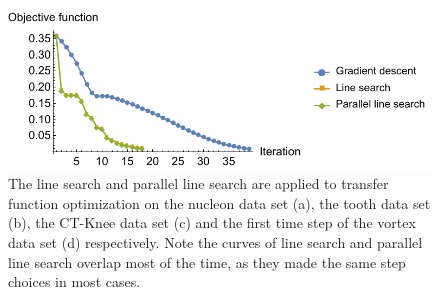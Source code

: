 \begin{figure}
	\begin{minipage}{.5\textwidth}
		\includegraphics[width=1\linewidth]{figures/vortex_naive_proportional_rms_fixed_linesearch_parallel}
		\subcaption{}
	\end{minipage}	
	\caption[The line search and parallel line search]{The line search and parallel line search are applied to transfer function optimization on the nucleon data set (a), the tooth data set (b), the CT-Knee data set (c) and the first time step of the vortex data set (d) respectively. Note the curves of line search and parallel line search overlap most of the time, as they made the same step choices in most cases.}
	\label{fig:nucleon_naive_tooth_naive_rms_linesearch}
\end{figure}


